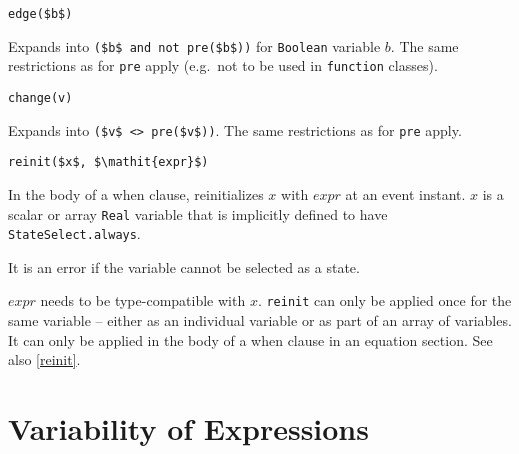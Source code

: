 \begin{operatordefinition}[edge]
\begin{synopsis}\begin{lstlisting}
edge($b$)
\end{lstlisting}\end{synopsis}
\begin{semantics}
Expands into \lstinline!($b$ and not pre($b$))! for \lstinline!Boolean! variable $b$.  The same restrictions as for \lstinline!pre! apply (e.g.\ not to be used in \lstinline!function! classes).
\end{semantics}
\end{operatordefinition}

\begin{operatordefinition}[change]
\begin{synopsis}\begin{lstlisting}
change(v)
\end{lstlisting}\end{synopsis}
\begin{semantics}
Expands into \lstinline!($v$ <> pre($v$))!.  The same restrictions as for \lstinline!pre! apply.
\end{semantics}
\end{operatordefinition}

\begin{operatordefinition}[reinit]
\begin{synopsis}\begin{lstlisting}
reinit($x$, $\mathit{expr}$)
\end{lstlisting}\end{synopsis}
\begin{semantics}
In the body of a when clause, reinitializes $x$ with $\mathit{expr}$ at an event instant.  $x$ is a scalar or array \lstinline!Real! variable that is implicitly defined to have \lstinline!StateSelect.always!.
\begin{nonnormative}
It is an error if the variable cannot be selected as a state.
\end{nonnormative}
$\mathit{expr}$ needs to be type-compatible with $x$.  \lstinline!reinit! can only be applied once for the same variable -- either as an individual variable or as part of an array of variables.  It can only be applied in the body of a when clause in an equation section.  See also \cref{reinit}.
\end{semantics}
\end{operatordefinition}

\section{Variability of Expressions}\label{variability-of-expressions}

